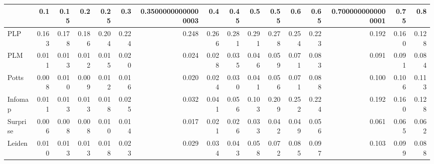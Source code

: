 \begin{tabular}{lrrrrrrrrrrrrrrr}
\toprule
{} &   0.1 &  0.15 &   0.2 &  0.25 &   0.3 & 0.35000000000000003 &   0.4 &  0.45 &   0.5 &  0.55 &   0.6 &  0.65 & 0.7000000000000001 &  0.75 &   0.8 \\
\midrule
PLP      & 0.163 & 0.178 & 0.186 & 0.204 & 0.224 &               0.248 & 0.266 & 0.281 & 0.291 & 0.278 & 0.254 & 0.223 &              0.192 & 0.160 & 0.128 \\
PLM      & 0.011 & 0.013 & 0.012 & 0.015 & 0.020 &               0.024 & 0.028 & 0.035 & 0.046 & 0.059 & 0.071 & 0.083 &              0.091 & 0.091 & 0.084 \\
Potts    & 0.008 & 0.010 & 0.009 & 0.012 & 0.016 &               0.020 & 0.024 & 0.030 & 0.041 & 0.056 & 0.071 & 0.088 &              0.100 & 0.106 & 0.113 \\
Infomap  & 0.011 & 0.013 & 0.013 & 0.018 & 0.025 &               0.032 & 0.041 & 0.056 & 0.103 & 0.209 & 0.252 & 0.224 &              0.192 & 0.160 & 0.128 \\
Surprise & 0.006 & 0.008 & 0.008 & 0.010 & 0.014 &               0.017 & 0.021 & 0.026 & 0.033 & 0.042 & 0.049 & 0.056 &              0.061 & 0.065 & 0.062 \\
Leiden   & 0.010 & 0.013 & 0.013 & 0.018 & 0.023 &               0.029 & 0.034 & 0.043 & 0.058 & 0.072 & 0.085 & 0.097 &              0.103 & 0.099 & 0.088 \\
\bottomrule
\end{tabular}

